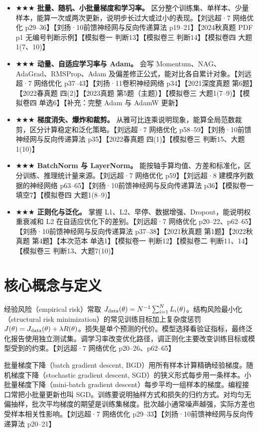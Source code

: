 \documentclass[UTF8,a4paper,zihao=-4,fontset=fandol]{ctexrep}
\begin{document}
\begin{itemize}
\item \textbf{\(\bigstar\bigstar\bigstar\) 批量、随机、小批量梯度和学习率。} 区分整个训练集、单样本、少量样本，能算一次或两次更新，说明步长过大或过小的表现。【刘远超·7 网络优化 p29--36】【刘扬·10前馈神经网与反向传递算法 p19--21】【2024秋真题 PDF p1 无编号判断示例】【模拟卷一 判断13】【模拟卷三 判断14】【模拟卷四 大题1(7、10)】
\item \textbf{\(\bigstar\bigstar\bigstar\) 动量、自适应学习率与 Adam。} 会写 Momentum、NAG、AdaGrad、RMSProp、Adam 及偏差修正公式，能对比各自累计对象。【刘远超·7 网络优化 p37--43】【刘扬·11卷积神经网络 p34】【2021深度真题 第6题】【2022春真题 四(2)】【2023真题 第5题（主题）】【模拟卷三 大题1(7--9)】【模拟卷四 单选6】【补充：完整 Adam 与 AdamW 更新】
\item \textbf{\(\bigstar\bigstar\bigstar\) 梯度消失、爆炸和裁剪。} 从雅可比连乘说明现象，能算全局范数裁剪，区分计算稳定和泛化策略。【刘远超·7 网络优化 p58--59】【刘扬·10前馈神经网与反向传递算法 p35】【2022春真题 四(1)】【模拟卷三 判断15、大题1(10)】
\item \textbf{\(\bigstar\bigstar\bigstar\) BatchNorm 与 LayerNorm。} 能按轴手算均值、方差和标准化，区分训练、推理统计量来源。【刘远超·7 网络优化 p59】【刘远超·8 建模序列数据的神经网络 p63--65】【刘扬·10前馈神经网与反向传递算法 p36】【模拟卷一 填空7】【模拟卷四 大题1(8--9)】
\item \textbf{\(\bigstar\bigstar\bigstar\) 正则化与泛化。} 掌握 L1、L2、早停、数据增强、Dropout，能说明权重衰减和 L2 在自适应优化下的差别。【刘远超·7 网络优化 p20--22、p62--65】【刘扬·10前馈神经网与反向传递算法 p37--38】【2021秋真题 第1题】【2022秋真题 第4题】【本次范本 单选1】【模拟卷一 判断12】【模拟卷二 判断11、14】【模拟卷三 判断13、大题7(10)】
\end{itemize}

\section{核心概念与定义}

经验风险（empirical risk）常取 $J_{\rm data}(\theta)=N^{-1}\sum_{i=1}^N L_i(\theta)$。结构风险最小化（structural risk minimization）的常见训练目标加上复杂度惩罚 $J(\theta)=J_{\rm data}(\theta)+\lambda R(\theta)$。损失是单个预测的代价。模型选择看验证指标，最终泛化报告使用独立测试集。调学习率改变优化路径，调正则化主要改变训练目标或模型受到的约束。【刘远超·7 网络优化 p20--26、p62--65】

批量梯度下降（batch gradient descent, BGD）用所有样本计算精确经验梯度。随机梯度下降（stochastic gradient descent, SGD）的狭义形式每步用一条样本。小批量梯度下降（mini-batch gradient descent）每步平均一组样本的梯度。编程接口常把小批量更新也叫 SGD。训练要说明抽样方式和损失的归约方式。对均匀无偏抽样，批次平均梯度的期望是训练集梯度。批次越小通常噪声越强，实际方差也受样本相关性影响。【刘远超·7 网络优化 p29--33】【刘扬·10前馈神经网与反向传递算法 p20--21】
\end{document}
